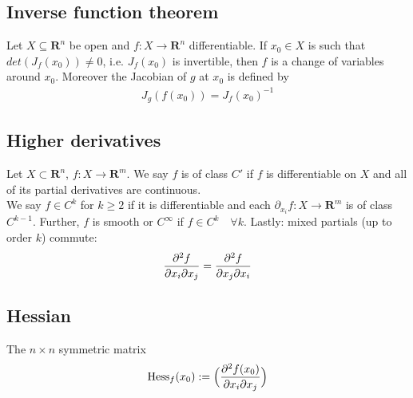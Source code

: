 \documentclass[8pt]{extarticle}
\newcommand{\R}{{\mathbb R}}
\newcommand{\X}{{\mathcal X}}
\newcommand{\ra}{{\rightarrow}}
\def\R{\mathbf{R}}
\def\X{X}
\begin{document}
\begin{multicols*}{3}
  \subsection{Inverse function theorem}
  Let $\X \subseteq \R^n$ be open and
  $f: \X \ra \R^n$ differentiable. If $x_0 \in \X$
  is such that $det(J_f(x_0)) \neq 0$, i.e. $J_f(x_0)$ is invertible, then
  $f$ is a change of variables around $x_0$. Moreover the Jacobian of $g$
  at $x_0$ is defined by
  \begin{align*}
    J_g(f(x_0)) = J_f(x_0)^{-1}
  \end{align*}
  \subsection{Higher derivatives}
  Let $\X \subset \R^n$, $f: \X \ra \R^m$. We say $f$
  is of class $C'$ if $f$ is differentiable on $\X$ and all
  of its partial derivatives are continuous.\\
  We say $f \in C^k$ for $k \geq 2$ if it is
  differentiable and each $\partial_{x_i} f : \X \ra \R^m$
  is of class $C^{k-1}$. Further, $f$ is smooth or $C^\infty$ if
  $f \in C^k \quad \forall k$. Lastly: mixed partials (up to order $k$)
  commute:
  \begin{align*}
    \pdv{^2 f}{x_i \partial x_j} = \pdv{^2 f}{ x_j \partial x_i}
  \end{align*}
  \subsection{Hessian}
  The $n \times n$ symmetric matrix
  \begin{align*}
    \text{Hess}_f(x_0) := \Big( \pdv{^2 f(x_0)}{x_i \partial x_j} \Big)
  \end{align*}

\end{multicols*}
\end{document}
